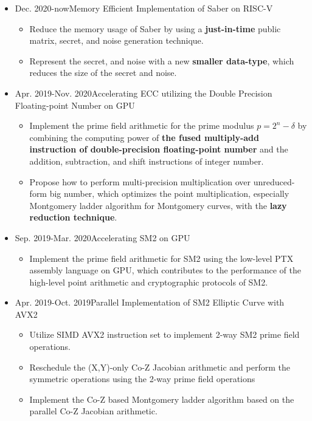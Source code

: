 \documentclass[letterpaper,11pt]{article}
\newcommand{\resitem}[1]{\item #1 \vspace{-2pt}}
\begin{document}
\begin{itemize}
	\item
	Dec. 2020-now\quad Memory Efficient Implementation of Saber on RISC-V
	\begin{itemize}
		\resitem{Reduce the memory usage of Saber by using a \textbf{just-in-time} public matrix, secret, and noise generation technique.}
		\resitem{Represent the secret, and noise with a new \textbf{smaller data-type}, which reduces the size of the secret and noise.}
	\end{itemize}
	\item
	Apr. 2019-Nov. 2020\quad Accelerating ECC utilizing the Double Precision Floating-point Number on GPU
	\begin{itemize}
		\resitem{Implement the prime field arithmetic for the prime modulus $p=2^n-\delta$ by combining the computing power of \textbf{the fused multiply-add instruction of double-precision floating-point number} and the addition, subtraction, and shift instructions of integer number. }
		\resitem{Propose how to perform multi-precision multiplication over unreduced-form big number, which optimizes the point multiplication, especially Montgomery ladder algorithm for Montgomery curves, with the \textbf{lazy reduction technique}.}
	\end{itemize}
	\item
	Sep. 2019-Mar. 2020\quad Accelerating SM2 on GPU
	\begin{itemize}
		\resitem{Implement the prime field arithmetic for SM2 using the low-level PTX assembly language on GPU, which contributes to the performance of the high-level point arithmetic and cryptographic protocols of SM2.}
	\end{itemize}
	\item
	Apr. 2019-Oct. 2019\quad Parallel Implementation of SM2 Elliptic Curve with AVX2
	\begin{itemize}
		\resitem{Utilize SIMD AVX2 instruction set to implement 2-way SM2 prime field operations.}

		\resitem{Reschedule the (X,Y)-only Co-Z Jacobian arithmetic and perform the symmetric operations using the 2-way prime field operations}

		\resitem{Implement the Co-Z based Montgomery ladder algorithm based on the parallel Co-Z Jacobian arithmetic.}


\end{itemize}
\end{itemize}
\end{document}

